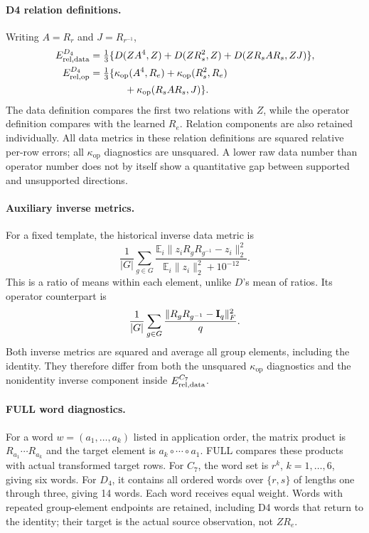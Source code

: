 \paragraph{D4 relation definitions.}
Writing $A=R_r$ and $J=R_{r^{-1}}$,
\begin{align*}
 E_{\mathrm{rel,data}}^{D_4}
 &=
 \tfrac13\{
 D(ZA^4,Z)
 +D(ZR_s^2,Z)
 +D(ZR_sAR_s,ZJ)
 \},
 \\
 E_{\mathrm{rel,op}}^{D_4}
 &=
 \tfrac13\{
 \kappa_{\mathrm{op}}(A^4,R_e)
 +\kappa_{\mathrm{op}}(R_s^2,R_e)
 \\
 &\hspace{3.5em}
 +\kappa_{\mathrm{op}}(R_sAR_s,J)
 \}.
\end{align*}
The data definition compares the first two relations with $Z$,
while the operator definition compares with the learned $R_e$.
Relation components are also retained individually.
All data metrics in these relation definitions are squared
relative per-row errors; all $\kappa_{\mathrm{op}}$
diagnostics are unsquared.
A lower raw data number than operator number does not by itself
show a quantitative gap between supported and unsupported
directions.

\paragraph{Auxiliary inverse metrics.}
For a fixed template, the historical inverse data metric is
\[
 \frac1{|G|}\sum_{g\in G}
 \frac{
 \mathbb E_i
 \|z_iR_gR_{g^{-1}}-z_i\|_2^2
 }{
 \mathbb E_i\|z_i\|_2^2+10^{-12}
 }.
\]
This is a ratio of means within each element, unlike $D$'s
mean of ratios.
Its operator counterpart is
\[
 \frac1{|G|}\sum_{g\in G}
 \frac{\|R_gR_{g^{-1}}-\mathbf{I}_q\|_F^2}{q}.
\]
Both inverse metrics are squared and average all group
elements, including the identity.
They therefore differ from both the unsquared
$\kappa_{\mathrm{op}}$ diagnostics and the nonidentity
inverse component inside $E_{\mathrm{rel,data}}^{C_7}$.

\paragraph{FULL word diagnostics.}
For a word $w=(a_1,\ldots,a_k)$ listed in application order,
the matrix product is $R_{a_1}\cdots R_{a_k}$ and the target
element is $a_k\circ\cdots\circ a_1$.
FULL compares these products with actual transformed target
rows.
For $C_7$, the word set is $r^k$, $k=1,\ldots,6$,
giving six words.
For $D_4$, it contains all ordered words over $\{r,s\}$
of lengths one through three, giving 14 words.
Each word receives equal weight.
Words with repeated group-element endpoints are retained,
including D4 words that return to the identity; their
target is the actual source observation, not $ZR_e$.

